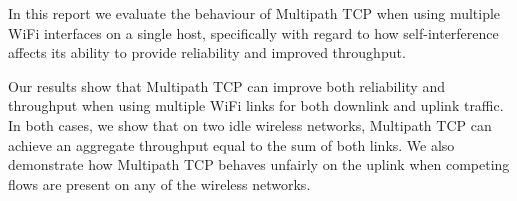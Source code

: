 In this report we evaluate the behaviour of Multipath TCP when using multiple
WiFi interfaces on a single host, specifically with regard to how
self-interference affects its ability to provide reliability and improved
throughput.

Our results show that Multipath TCP can improve both reliability and throughput
when using multiple WiFi links for both downlink and uplink traffic. In both
cases, we show that on two idle wireless networks, Multipath TCP can achieve an
aggregate throughput equal to the sum of both links. We also demonstrate how
Multipath TCP behaves unfairly on the uplink when competing flows are present on
any of the wireless networks.

